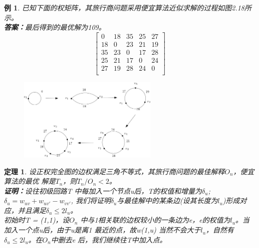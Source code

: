 \documentclass[11pt,a4paper,openany]{book}
\newtheorem{theorem}{\textbf{定理}}[section]
\newtheorem{sample}{\textbf{例}}[section]
\begin{document}
\begin{sample}
已知下面的权矩阵，其旅行商问题采用便宜算法近似求解的过程如图2.18所示。\\
\textbf{答案：}最后得到的最优解为109。
$$\left[
  \begin{array}{ccccc}
    0  & 18 & 35 & 25 & 27 \\
    18 & 0 & 23 & 21 & 19 \\
    35 & 23 & 0 & 17 & 28 \\
    25 & 21 & 17 & 0 & 24 \\
    27 & 19 & 28 & 24 & 0 \\
  \end{array}
\right]$$
\begin{figure}[H]
  \centering
  \includegraphics[width=0.6\textwidth]{2.19.png}
  \caption{}
\end{figure}

\end{sample}
\begin{theorem}
设正权完全图的边权满足三角不等式，其旅行商问题的最佳解释$O_n$，便宜算法的最优
解是$T_n$，则$T_n /O_n < 2$。\\
\textbf{证明：}设往初级回路T 中每加入一个节点u后，T的权值和增量为$\delta_u$; $\delta_u=w_{uv} +w_{uv'} −w_{vv'}$,
我们将证明$\delta_u$与最佳解中的某条边(设其长度为$l_u$)形成对应，并且满足$\delta_u\leq2l_u$。\\
\indent 初始时T = {(1,1)}，设$O_n$ 中与1相关联的边权较小的一条边为e，e的权值为$l_u$。当加入一个点u后，由于u是离1 最近的点，故w(1,u) 当然不会大于$l_u$，自然有$\delta_u\leq2l_u$。在$O_n$中删去e 后，我们继续往T中加入点。\\
\end{theorem}
\end{document}
